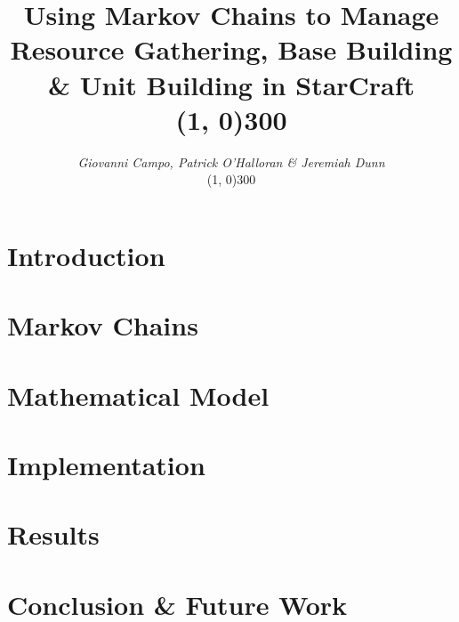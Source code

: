 \documentclass[12pt]{article}
\title{Using Markov Chains to Manage Resource Gathering, Base Building \& Unit Building in StarCraft\\\vspace{0.8cm}
\line(1, 0){300}\vspace{-0.3cm}
}
\author
{\textit{Giovanni Campo, Patrick O'Halloran \& Jeremiah Dunn}\vspace{0.3cm}\\\vspace{0.1cm}\line(1, 0){300}\vspace{2.3cm}}
\date{}
\newenvironment{sciabstract}{%
\begin{quote} \bf}
{\end{quote}}
\begin{document}
 

\baselineskip24pt


\maketitle 




\begin{sciabstract}
 	
 	\vspace{1.0cm}
\end{sciabstract}


\section{Introduction}




\section{Markov Chains}



\section{Mathematical Model}



\section{Implementation}




\section{Results}



\section{Conclusion \& Future Work}





\newpage


\label{endpage}
\end{document}
